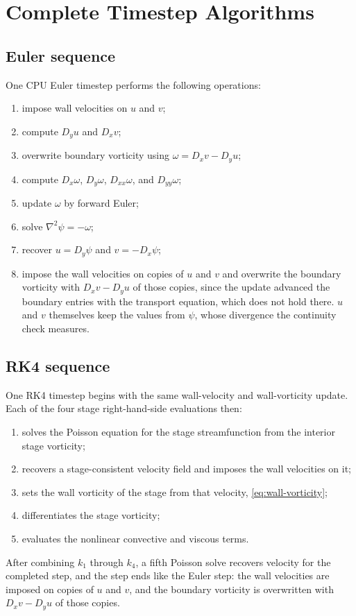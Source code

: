 \documentclass[11pt,a4paper]{article}
\begin{document}
\section{Complete Timestep Algorithms}

\subsection{Euler sequence}

One CPU Euler timestep performs the following operations:
\begin{enumerate}[leftmargin=2em]
  \item impose wall velocities on $u$ and $v$;
  \item compute $D_yu$ and $D_xv$;
  \item overwrite boundary vorticity using $\omega=D_xv-D_yu$;
  \item compute $D_x\omega$, $D_y\omega$, $D_{xx}\omega$, and $D_{yy}\omega$;
  \item update $\omega$ by forward Euler;
  \item solve $\nabla^2\psi=-\omega$;
  \item recover $u=D_y\psi$ and $v=-D_x\psi$;
  \item impose the wall velocities on copies of $u$ and $v$ and overwrite the boundary vorticity with $D_xv-D_yu$ of those copies, since the update advanced the boundary entries with the transport equation, which does not hold there.  $u$ and $v$ themselves keep the values from $\psi$, whose divergence the continuity check measures.
\end{enumerate}

\subsection{RK4 sequence}

One RK4 timestep begins with the same wall-velocity and wall-vorticity update.  Each of the four stage right-hand-side evaluations then:
\begin{enumerate}[leftmargin=2em]
  \item solves the Poisson equation for the stage streamfunction from the interior stage vorticity;
  \item recovers a stage-consistent velocity field and imposes the wall velocities on it;
  \item sets the wall vorticity of the stage from that velocity, \cref{eq:wall-vorticity};
  \item differentiates the stage vorticity;
  \item evaluates the nonlinear convective and viscous terms.
\end{enumerate}
After combining $k_1$ through $k_4$, a fifth Poisson solve recovers velocity for the completed step, and the step ends like the Euler step: the wall velocities are imposed on copies of $u$ and $v$, and the boundary vorticity is overwritten with $D_xv-D_yu$ of those copies.
\end{document}
